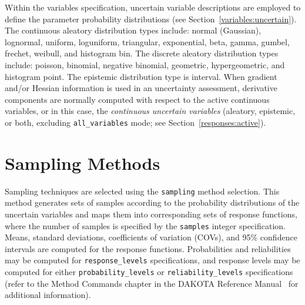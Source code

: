 Within the variables specification, uncertain variable descriptions
are employed to define the parameter probability distributions (see
Section~\ref{variables:uncertain}). The continuous aleatory
distribution types include: normal (Gaussian), lognormal, uniform,
loguniform, triangular, exponential, beta, gamma, gumbel, frechet,
weibull, and histogram bin.  The discrete aleatory distribution types
include: poisson, binomial, negative binomial, geometric,
hypergeometric, and histogram point.  The epistemic distribution type
is interval.  When gradient and/or Hessian information is used in an
uncertainty assessment, derivative components are normally computed
with respect to the active continuous variables, or in this case, the
\emph{continuous uncertain variables} (aleatory, epistemic, 
or both, excluding \texttt{all\_variables} mode; see 
Section~\ref{responses:active}).

\section{Sampling Methods}\label{uq:sampling}

Sampling techniques are selected using the \texttt{sampling}
method selection. This method generates sets of samples according to
the probability distributions of the uncertain variables and maps them
into corresponding sets of response functions, where the number of
samples is specified by the \texttt{samples} integer specification.
Means, standard deviations, coefficients of variation (COVs), and 95\%
confidence intervals are computed for the response functions.
Probabilities and reliabilities may be computed for 
\texttt{response\_levels} specifications, and response levels may be
computed for either \texttt{probability\_levels} or
\texttt{reliability\_levels} specifications (refer to the Method
Commands chapter in the DAKOTA Reference Manual~\cite{RefMan} for
additional information).

